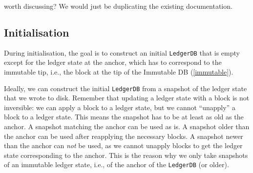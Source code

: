  worth discussing? We would just be duplicating the existing
documentation.

\subsection{Initialisation}
\label{ledgerdb:on-disk:initialisation}

During initialisation, the goal is to construct an initial \lstinline!LedgerDB!
that is empty except for the ledger state at the anchor, which has to correspond
to the immutable tip, i.e., the block at the tip of the Immutable DB
(\cref{immutable}).

Ideally, we can construct the initial \lstinline!LedgerDB! from a snapshot of
the ledger state that we wrote to disk. Remember that updating a ledger state
with a block is not inversible: we can apply a block to a ledger state, but we
cannot ``unapply'' a block to a ledger state. This means the snapshot has to be
at least as old as the anchor. A snapshot matching the anchor can be used as is.
A snapshot older than the anchor can be used after reapplying the necessary
blocks. A snapshot newer than the anchor can \emph{not} be used, as we cannot
unapply blocks to get the ledger state corresponding to the anchor. This is the
reason why we only take snapshots of an immutable ledger state, i.e., of the
anchor of the \lstinline!LedgerDB! (or older).

